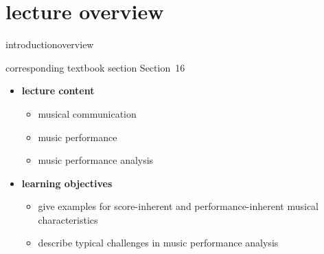 


\subtitle{Module 16: Music Performance Analysis}


	

    \section[overview]{lecture overview}
        \begin{frame}{introduction}{overview}
            \begin{block}{corresponding textbook section}
                    Section~16
            \end{block}

            \begin{itemize}
                \item   \textbf{lecture content}
                    \begin{itemize}
                        \item   musical communication
                        \item   music performance
                        \item   music performance analysis
                    \end{itemize}
                \bigskip
                \item<2->   \textbf{learning objectives}
                    \begin{itemize}
                        \item   give examples for score-inherent and performance-inherent musical characteristics
                        \item   describe typical challenges in music performance analysis
                    \end{itemize}
            \end{itemize}
        \end{frame}

